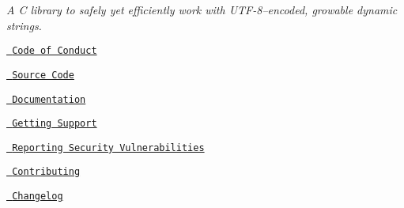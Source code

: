 \label{index_md_README}%
%
 {\itshape A C library to safely yet efficiently work with UTF-\/8–encoded, growable dynamic strings.}


\begin{DoxyItemize}
\item \href{https://github.com/SFM61319/ds/blob/main/CODE_OF_CONDUCT.md}{\texttt{ Code of Conduct}}
\item \href{https://github.com/SFM61319/ds}{\texttt{ Source Code}}
\item \href{https://sfm61319.github.io/ds/}{\texttt{ Documentation}}
\item \href{https://github.com/SFM61319/ds/blob/main/SUPPORT.md}{\texttt{ Getting Support}}
\item \href{https://github.com/SFM61319/ds/security/policy}{\texttt{ Reporting Security Vulnerabilities}}
\item \href{https://github.com/SFM61319/ds/blob/main/CONTRIBUTING.md}{\texttt{ Contributing}}
\item \href{https://github.com/SFM61319/ds/blob/main/CHANGELOG.md}{\texttt{ Changelog}} 
\end{DoxyItemize}